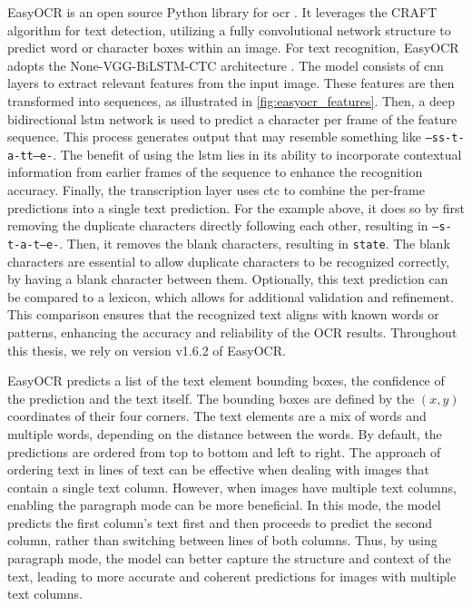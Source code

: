 EasyOCR is an open source Python library for \gls{ocr} \cite{easyocr_gitub_2020}.
It leverages the CRAFT algorithm \cite{craft_2019} for text detection, utilizing a fully convolutional network structure to predict word or character boxes within an image.
For text recognition, EasyOCR adopts the None-VGG-BiLSTM-CTC architecture \cite{crnn_2015}.
The model consists of \gls{cnn} layers to extract relevant features from the input image.
These features are then transformed into sequences, as illustrated in \autoref{fig:easyocr_features}.
Then, a deep bidirectional \gls{lstm} network is used to predict a character per frame of the feature sequence.
This process generates output that may resemble something like \texttt{--ss-t-a-tt--e-}.
The benefit of using the \gls{lstm} lies in its ability to incorporate contextual information from earlier frames of the sequence to enhance the recognition accuracy.
Finally, the transcription layer uses \gls{ctc} to combine the per-frame predictions into a single text prediction.
For the example above, it does so by first removing the duplicate characters directly following each other, resulting in \texttt{--s-t-a-t--e-}.
Then, it removes the blank characters, resulting in \texttt{state}.
The blank characters are essential to allow duplicate characters to be recognized correctly, by having a blank character between them.
Optionally, this text prediction can be compared to a lexicon, which allows for additional validation and refinement.
This comparison ensures that the recognized text aligns with known words or patterns, enhancing the accuracy and reliability of the OCR results.
Throughout this thesis, we rely on version v1.6.2 of EasyOCR.

EasyOCR predicts a list of the text element bounding boxes, the confidence of the prediction and the text itself.
The bounding boxes are defined by the $(x, y)$ coordinates of their four corners.
The text elements are a mix of words and multiple words, depending on the distance between the words.
By default, the predictions are ordered from top to bottom and left to right.
The approach of ordering text in lines of text can be effective when dealing with images that contain a single text column.
However, when images have multiple text columns, enabling the paragraph mode can be more beneficial.
In this mode, the model predicts the first column's text first and then proceeds to predict the second column, rather than switching between lines of both columns.
Thus, by using paragraph mode, the model can better capture the structure and context of the text, leading to more accurate and coherent predictions for images with multiple text columns.


